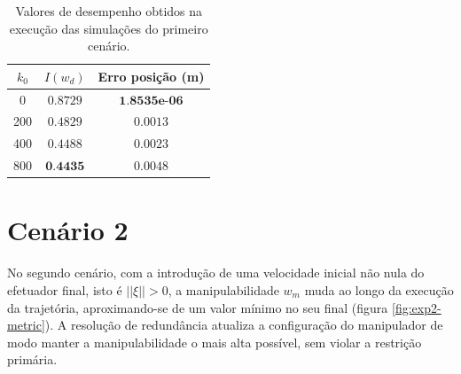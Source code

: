 \begin{table}[htbp]
    \centering
    \begin{tabular}{ccc}
        \toprule
        \( k_0 \) & \( I(w_d) \)  & Erro posição (m) \\
        \midrule
        0  & \( 0.8729 \) & \( \textbf{1.8535e-06} \) \\
        200  & \( 0.4829 \) & \( 0.0013 \) \\
        400  & \( 0.4488 \) & \( 0.0023 \) \\
        800  & \( \textbf{0.4435} \) & \( 0.0048 \) \\
        \bottomrule
    \end{tabular}
    \caption{Valores de desempenho obtidos na execução das simulações do primeiro cenário.}
    \label{tab:scores-exp1}
\end{table}

\section{Cenário 2}
	
No segundo cenário, com a introdução de uma velocidade inicial não nula do efetuador final, isto é \(||\xi|| > 0 \), 
a manipulabilidade \(w_m\) muda ao longo da execução da trajetória, aproximando-se de um valor mínimo no seu final (figura \ref*{fig:exp2-metric}). 
A resolução de redundância atualiza a configuração do manipulador de modo manter a manipulabilidade o mais 
alta possível, sem violar a restrição primária.


